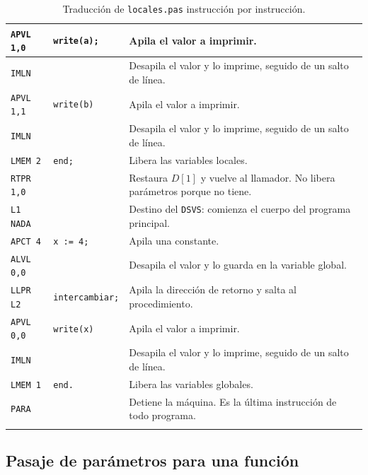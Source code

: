\documentclass[12pt]{article}
\begin{document}
\begin{longtable}{|p{3.2cm}|p{5cm}|p{7cm}|}
\hline
\texttt{APVL 1,0} & \texttt{write(a);} & Apila el valor a imprimir. \\
\hline
\texttt{IMLN} & \texttt{} & Desapila el valor y lo imprime, seguido de un salto de línea. \\
\hline
\texttt{APVL 1,1} & \texttt{write(b)} & Apila el valor a imprimir. \\
\hline
\texttt{IMLN} & \texttt{} & Desapila el valor y lo imprime, seguido de un salto de línea. \\
\hline
\texttt{LMEM 2} & \texttt{end;} & Libera las variables locales. \\
\hline
\texttt{RTPR 1,0} & \texttt{} & Restaura $D[1]$ y vuelve al llamador. No libera parámetros porque no tiene. \\
\hline
\texttt{L1 NADA} & \texttt{} & Destino del \texttt{DSVS}: comienza el cuerpo del programa principal. \\
\hline
\texttt{APCT 4} & \texttt{x := 4;} & Apila una constante. \\
\hline
\texttt{ALVL 0,0} & \texttt{} & Desapila el valor y lo guarda en la variable global. \\
\hline
\texttt{LLPR L2} & \texttt{intercambiar;} & Apila la dirección de retorno y salta al procedimiento. \\
\hline
\texttt{APVL 0,0} & \texttt{write(x)} & Apila el valor a imprimir. \\
\hline
\texttt{IMLN} & \texttt{} & Desapila el valor y lo imprime, seguido de un salto de línea. \\
\hline
\texttt{LMEM 1} & \texttt{end.} & Libera las variables globales. \\
\hline
\texttt{PARA} & \texttt{} & Detiene la máquina. Es la última instrucción de todo programa. \\
\hline
\caption{Traducción de \texttt{locales.pas} instrucción por instrucción.}
\label{tab:locales}
\end{longtable}

\subsection{Pasaje de parámetros para una función}

\end{document}
